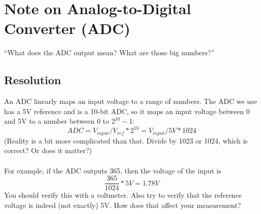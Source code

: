 \documentclass[letter,10pt]{article}
\begin{document}
\section*{Note on Analog-to-Digital Converter (ADC)}

``What does the ADC output mean? What are those big numbers?''

\subsection*{Resolution}
An ADC linearly maps an input voltage to a range of numbers. The ADC we use has a 5V reference and is a 10-bit ADC, so it maps an input voltage between 0 and 5V to a number between 0 to $2^{10} - 1$:
\begin{equation}
ADC = V_{input} / V_{ref} * 2^{10} = V_{input} / 5V * 1024
\end{equation}
(Reality is a bit more complicated than that. Divide by 1023 or 1024, which is correct? Or does it matter?)\\
\\
For example, if the ADC outputs 365, then the voltage of the input is
\begin{equation}
\frac{365}{1024}*5V = 1.78V
\end{equation}
You should verify this with a voltmeter. Also try to verify that the reference voltage is indeed (not exactly) 5V. How does that affect your measurement?
\end{document}
